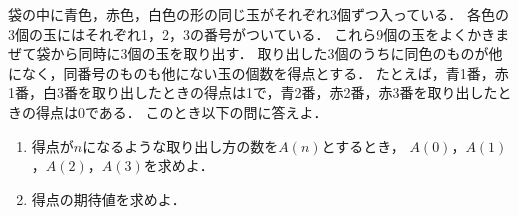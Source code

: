 \documentclass[../../main.tex]{subfiles}
\begin{document}
袋の中に青色，赤色，白色の形の同じ玉がそれぞれ3個ずつ入っている．
各色の3個の玉にはそれぞれ1，2，3の番号がついている．
これら9個の玉をよくかきまぜて袋から同時に3個の玉を取り出す．
取り出した3個のうちに同色のものが他になく，同番号のものも他にない玉の個数を得点とする．
たとえば，青1番，赤1番，白3番を取り出したときの得点は1で，青2番，赤2番，赤3番を取り出したときの得点は0である．
このとき以下の問に答えよ．
\begin{enumerate}
  \item 得点が$n$になるような取り出し方の数を$A(n)$とするとき，
    $A(0)$，$A(1)$，$A(2)$，$A(3)$を求めよ．
  \item 得点の期待値を求めよ．
\end{enumerate}
\end{document}
